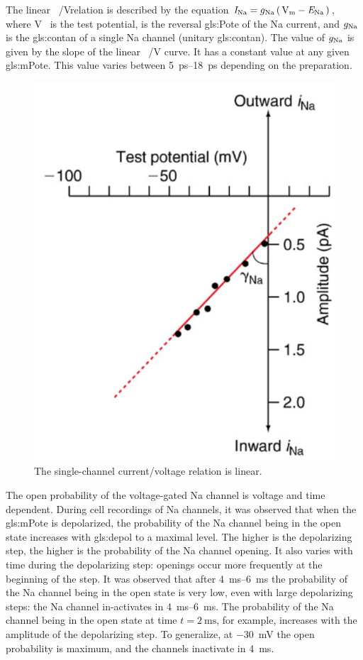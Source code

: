 \documentclass[class={myRUCProject}, crop=false]{standalone}
\begin{document}
The linear \unit[per-mode = symbol]{\cur\sodium\per\V}relation is described by the equation \(\cur\sodium = \con\sodium \br{\unit{\V\membrane}-\equilibria\sodium}\), where \unit{\V\membrane} is the test potential, \equilibria\sodium is the reversal \gls{gls:Pote} of the \gls{Na} current, and \(g_\mathrm{Na}\) is the \gls{gls:contan} of a single \gls{Na} channel (unitary \gls{gls:contan}). The value of \(g_\mathrm{Na}\) is given by the slope of the linear \unit[per-mode = symbol]{\cur\sodium\per\V} curve. It has a constant value at any given \gls{gls:mPote}. This value varies between \qtyrange{5}{18}{\pico\second} depending on the preparation.

\begin{figure}[H]
  \centering
  \includegraphics[width=0.5\linewidth]{Pictures//Anakin/iNa-VNa.png}
  \caption{The single-channel current/voltage \br{\unit[per-mode = symbol]{\cur\sodium\per\volt}} relation is linear. }
  \label{fig:NaVNa}
\end{figure}
The open probability of the voltage-gated \gls{Na} channel is voltage and time dependent. During cell recordings of \gls{Na} channels, it was observed that when the \gls{gls:mPote} is depolarized, the probability of the \gls{Na} channel being in the open state increases with \gls{gls:depol} to a maximal level. The higher is the depolarizing step, the higher is the probability of the \gls{Na} channel opening. It also varies with time during the depolarizing step: openings occur more frequently at the beginning of the step. It was observed that after \qtyrange{4}{6}{\ms} the probability of the \gls{Na} channel being in the open state is very low, even with large depolarizing steps: the \gls{Na} channel in-activates in \qtyrange{4}{6}{\ms}. The probability of the \gls{Na} channel being in the open state at time \(t=\qty{2}{\ms}\), for example, increases with the amplitude of the depolarizing step. To generalize, at \qty{-30}{\mV} the open probability is maximum, and the channels inactivate in \qty{4}{\ms}. 
\end{document}

